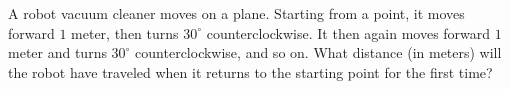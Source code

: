 A robot vacuum cleaner moves on a plane. Starting from a point, it moves forward $1$ meter, then turns $30^{\circ}$ counterclockwise. It then again moves forward $1$ meter and turns $30^{\circ}$ counterclockwise, and so on. What distance (in meters) will the robot have traveled when it returns to the starting point for the first time?
